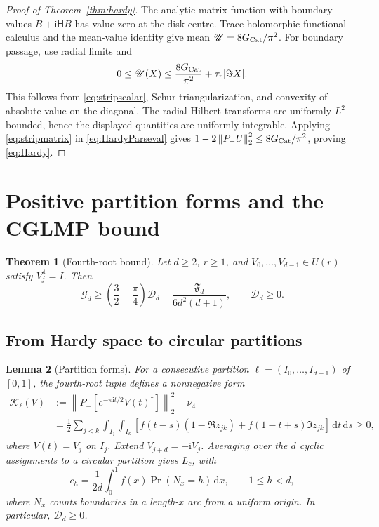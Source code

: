 \documentclass[11pt]{amsart}
\newtheorem{theorem}{Theorem}[section]
\newtheorem{lemma}[theorem]{Lemma}
\theoremstyle{remark}
\theoremstyle{plain}
\numberwithin{equation}{section}
\newcommand{\ii}{\mathrm i}
\newcommand{\dd}{\,\mathrm d}
\newcommand{\norm}[1]{\left\|#1\right\|}
\newcommand{\Gc}{G_{\rm Cat}}
\newcommand{\Fdef}{\mathfrak F_d}
\newcommand{\Gdef}{\mathcal G_d}
\newcommand{\Ddef}{\mathcal D_d}
\newcommand{\Hilb}{\mathsf H}
\begin{document}
\begin{proof}[Proof of Theorem~\ref{thm:hardy}]
The analytic matrix function with boundary values \(B+\ii\Hilb B\)
has value zero at the disk centre. Trace holomorphic functional
calculus and the mean-value identity give mean
\(\mathscr U=8\Gc/\pi^2\).
For boundary passage, use radial limits and
\[
 0\le\mathscr U(X)\le\frac{8\Gc}{\pi^2}+\tau_r|\Im X|.
\]
This follows from \eqref{eq:stripscalar}, Schur triangularization,
and convexity of absolute value on the diagonal.
The radial Hilbert transforms are uniformly \(L^2\)-bounded, hence
the displayed quantities are uniformly integrable.
Applying \eqref{eq:stripmatrix} in \eqref{eq:HardyParseval} gives
\(1-2\norm{P_-U}_2^2\le8\Gc/\pi^2\), proving \eqref{eq:Hardy}.
\end{proof}

\section{Positive partition forms and the CGLMP bound}
\label{sec:partition}

\begin{theorem}[Fourth-root bound]\label{thm:certificate}
Let \(d\ge2\), \(r\ge1\), and
\(V_0,\ldots,V_{d-1}\in U(r)\) satisfy \(V_j^4=I\).
Then
\begin{equation}\label{eq:strongcertificate}
 \Gdef\ge\left(\frac32-\frac\pi4\right)\Ddef
       +\frac{\Fdef}{6d^2(d+1)},\qquad \Ddef\ge0.
\end{equation}
\end{theorem}

\subsection{From Hardy space to circular partitions}

\begin{lemma}[Partition forms]\label{lem:partitions}
For a consecutive partition
\(\ell=(I_0,\ldots,I_{d-1})\) of \([0,1]\), the fourth-root tuple
defines a nonnegative form
\begin{equation}\label{eq:partitionform}
 \begin{split}
 \mathcal K_\ell(V)
 &:=
 \norm{P_-[e^{-\pi\ii t/2}V(t)^\dagger]}_2^2-\nu_4\\
 &=\frac12\sum_{j<k}\int_{I_j}\int_{I_k}
 \left[f(t-s)(1-\Re z_{jk})
       +f(1-t+s)\Im z_{jk}\right]\dd t\dd s\ge0,
 \end{split}
\end{equation}
where \(V(t)=V_j\) on \(I_j\).
Extend \(V_{j+d}=-\ii V_j\). Averaging over the \(d\) cyclic
assignments to a circular partition gives \(L_c\), with
\begin{equation}\label{eq:arccount}
 c_h=\frac1{2d}\int_0^1f(x)\Pr(N_x=h)\dd x,\qquad 1\le h<d,
\end{equation}
where \(N_x\) counts boundaries in a length-\(x\) arc from a uniform
origin. In particular, \(\Ddef\ge0\).
\end{lemma}
\end{document}
